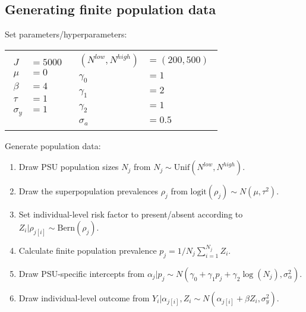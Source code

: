 \documentclass[10pt,a4paper]{article}
\begin{document}
\subsection*{Generating finite population data}\label{popdata}
Set parameters/hyperparameters:
\begin{center}
	\begin{tabular}{cc} 
		{$\!\begin{aligned}
			J &= 5000 \\
			\mu &= 0 \\
			\beta &= 4 \\
			\tau &= 1 \\
			\sigma_y &= 1 \\ \end{aligned}$} & {$\!\begin{aligned}
			(N^{low}, N^{high}) &= (200, 500) \\
			\gamma_0 &= 1 \\
			\gamma_1 &= 2 \\
			\gamma_2 &= 1 \\
			\sigma_a &= 0.5 \end{aligned}$}
	\end{tabular}
\end{center}
Generate population data:
\begin{enumerate}
	\item Draw PSU population sizes $N_j$ from $N_j \sim \mathrm{Unif}(N^{low}, N^{high})$.
	\item Draw the superpopulation prevalences $\rho_j$ from $\mathrm{logit}(\rho_j) \sim N(\mu, \tau^2)$.
	\item Set individual-level risk factor to present/absent according to $Z_i | \rho_{j[i]} \sim \mathrm{Bern}(\rho_j)$.
	\item Calculate finite population prevalence $p_j = 1/N_j \sum_{i=1}^{N_j} Z_i$.
	\item Draw PSU-specific intercepts from $\alpha_j | p_j \sim N(\gamma_0 + \gamma_1 p_j + \gamma_2 \log(N_j), \sigma_{\alpha}^2)$.
	\item Draw individual-level outcome from $Y_i | \alpha_{j[i]}, Z_i \sim N(\alpha_{j[i]} + \beta Z_i, \sigma_y^2)$.
\end{enumerate}
\end{document}
